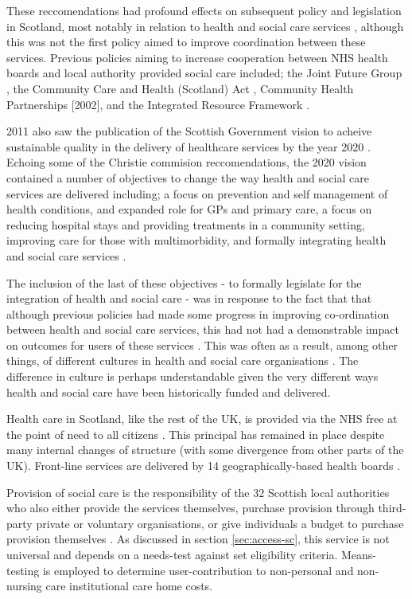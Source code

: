 \documentclass[12pt,]{report}
\begin{document}
These reccomendations had profound effects on subsequent policy and
legislation in Scotland, most notably in relation to health and social
care services \citep{RN451}, although this was not the first policy
aimed to improve coordination between these services. Previous policies
aiming to increase cooperation between NHS health boards and local
authority provided social care included; the Joint Future Group
\citeyearpar{RN452}, the Community Care and Health (Scotland) Act
\citeyearpar{RN453}, Community Health Partnerships {[}2002{]}, and the
Integrated Resource Framework \citep{RN454}.

2011 also saw the publication of the Scottish Government vision to
acheive sustainable quality in the delivery of healthcare services by
the year 2020 \citep{RN457}. Echoing some of the Christie commision
reccomendations, the 2020 vision contained a number of objectives to
change the way health and social care services are delivered including;
a focus on prevention and self management of health conditions, and
expanded role for GPs and primary care, a focus on reducing hospital
stays and providing treatments in a community setting, improving care
for those with multimorbidity, and formally integrating health and
social care services \citep{RN251}.

The inclusion of the last of these objectives - to formally legislate
for the integration of health and social care - was in response to the
fact that that although previous policies had made some progress in
improving co-ordination between health and social care services, this
had not had a demonstrable impact on outcomes for users of these
services \citep{RN458, RN252, RN369}. This was often as a result, among
other things, of different cultures in health and social care
organisations \citep{RN458}. The difference in culture is perhaps
understandable given the very different ways health and social care have
been historically funded and delivered.

Health care in Scotland, like the rest of the UK, is provided via the
NHS free at the point of need to all citizens \citep{RN456}. This
principal has remained in place despite many internal changes of
structure (with some divergence from other parts of the
UK)\citep{RN456}. Front-line services are delivered by 14
geographically-based health boards \citep{RN456}.

Provision of social care is the responsibility of the 32 Scottish local
authorities who also either provide the services themselves, purchase
provision through third-party private or voluntary organisations, or
give individuals a budget to purchase provision themselves
\citep{RN456}. As discussed in section \ref{sec:access-sc}, this service
is not universal and depends on a needs-test against set eligibility
criteria. Means-testing is employed to determine user-contribution to
non-personal and non-nursing care institutional care home costs.
\end{document}
